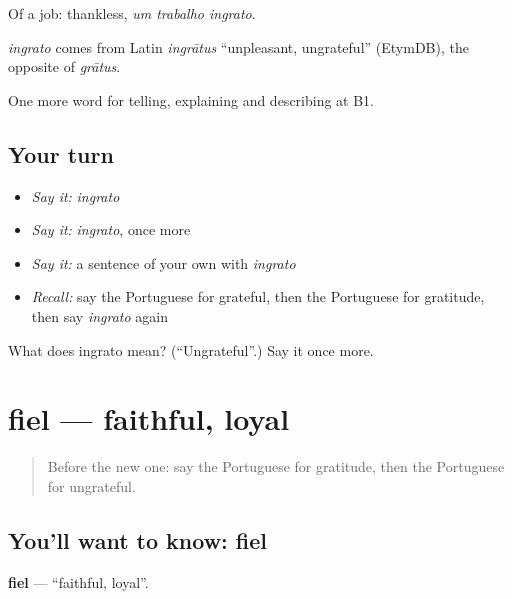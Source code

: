 Of a job: thankless, \emph{um trabalho ingrato}.

\begin{cousinweb}
\emph{ingrato} comes from Latin \emph{ingrātus} \textquotedblleft{}unpleasant, ungrateful\textquotedblright{} (EtymDB), the opposite of \emph{grātus}.
\end{cousinweb}

\begin{grammarlens}[title={What you've built}]
One more word for telling, explaining and describing at B1.
\end{grammarlens}

\subsection*{Your turn}
\begin{itemize}
\raggedright
  \item \emph{Say it:} \emph{ingrato}
  \item \emph{Say it:} \emph{ingrato}, once more
  \item \emph{Say it:} a sentence of your own with \emph{ingrato}
  \item \emph{Recall:} say the Portuguese for grateful, then the Portuguese for gratitude, then say \emph{ingrato} again
\end{itemize}

\begin{tcolorbox}[breakable,colback=teal!4,colframe=teal!35!black,title={Before you move on}]
What does ingrato mean? (\textquotedblleft{}Ungrateful\textquotedblright{}.) Say it once more.
\end{tcolorbox}
\section[fiel]{fiel — faithful, loyal}

\label{lesson:PT-C499-fiel}



\begin{quote}
Before the new one: say the Portuguese for gratitude, then the Portuguese for ungrateful.
\end{quote}

\subsection*{You'll want to know: fiel}
\textbf{fiel} — \textquotedblleft{}faithful, loyal\textquotedblright{}.


